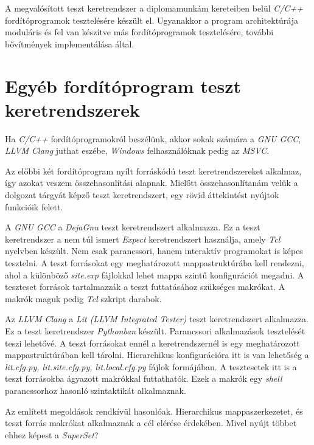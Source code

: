 A megvalósított teszt keretrendszer a diplomamunkám kereteiben belül \textit{C/C++} fordítóprogramok tesztelésére
készült el. Ugyanakkor a program architektúrája moduláris és fel van készítve más fordítóprogramok tesztelésére,
további bővítmények implementálása által.

\section{Egyéb fordítóprogram teszt keretrendszerek}\label{sec:ch1-outlook}

    Ha \textit{C/C++} fordítóprogramokról beszélünk, akkor sokak számára a \textit{GNU GCC}, \textit{LLVM Clang} juthat
    eszébe, \textit{Windows} felhasználóknak pedig az \textit{MSVC}.

    Az előbbi két fordítóprogram nyílt forráskódú teszt keretrendszereket alkalmaz, így azokat veszem összehasonlítási
    alapnak. Mielőtt összehasonlítanám velük a dolgozat tárgyát képző teszt keretrendszert, egy rövid áttekintést
    nyújtok funkcióik felett.

    A \textit{GNU GCC} a \textit{DejaGnu} teszt keretrendszert alkalmazza. Ez a teszt keretrendszer a nem túl ismert
    \textit{Expect} keretrendszert használja, amely \textit{Tcl} nyelvben készült. Nem csak parancssori, hanem
    interaktív programokat is képes tesztelni. A teszt forrásokat egy meghatározott mappastruktúrába kell rendezni,
    ahol a különböző \textit{site.exp} fájlokkal lehet mappa szintű konfigurációt megadni. A teszteset források
    tartalmazzák a teszt futtatásához szükséges makrókat. A makrók maguk pedig \textit{Tcl} szkript darabok.

    Az \textit{LLVM Clang} a \textit{Lit (LLVM Integrated Tester)} teszt keretrendszert alkalmazza. Ez a teszt
    keretrendszer \textit{Pythonban} készült. Parancssori alkalmazások tesztelését teszi lehetővé. A teszt forrásokat
    ennél a keretrendszernél is egy meghatározott mappastruktúrában kell tárolni. Hierarchikus konfigurációra itt is
    van lehetőség a \textit{lit.cfg.py, lit.site.cfg.py, lit.local.cfg.py} fájlok formájában. A tesztesetek itt is a
    teszt forrásokba ágyazott makrókkal futtathatók. Ezek a makrók egy \textit{shell} parancssorhoz hasonló
    szintaktikát alkalmaznak.

    Az említett megoldások rendkívül hasonlóak. Hierarchikus mappaszerkezetet, és \\ teszt forrás makrókat alkalmaznak
    a cél elérése érdekében. Mivel nyújt többet ehhez képest a \textit{SuperSet}?

